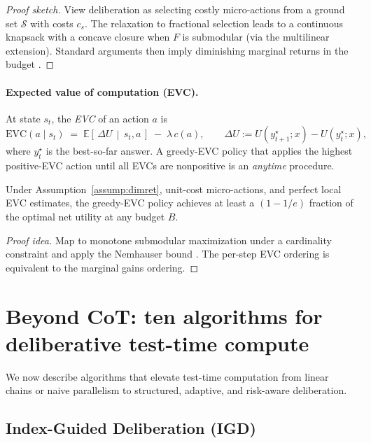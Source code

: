 \documentclass[11pt]{article}
\newcommand{\E}{\mathbb{E}}
\newcommand{\1}{\mathbb{I}}
\begin{document}
\begin{proof}[Proof sketch]
View deliberation as selecting costly micro-actions from a ground set $\mathcal{S}$ with costs $c_s$. The relaxation to fractional selection leads to a continuous knapsack with a concave closure when $F$ is submodular (via the multilinear extension). Standard arguments then imply diminishing marginal returns in the budget \cite{nemhauser1978}.
\end{proof}

\paragraph{Expected value of computation (EVC).} At state $s_t$, the \emph{EVC} of an action $a$ is
\begin{equation}
\mathrm{EVC}(a \mid s_t) \;=\; \E\!\left[\, \Delta U \,\middle|\, s_t, a \,\right] \;-\; \lambda\, c(a),
\qquad \Delta U := U(y^\star_{t+1};x)-U(y^\star_{t};x),
\label{eq:evc}
\end{equation}
where $y^\star_t$ is the best-so-far answer. A greedy-EVC policy that applies the highest positive-EVC action until all EVCs are nonpositive is an \emph{anytime} procedure.

\begin{theorem}
\label{thm:greedy}
Under Assumption~\ref{assump:dimret}, unit-cost micro-actions, and perfect local EVC estimates, the greedy-EVC policy achieves at least a $(1-1/e)$ fraction of the optimal net utility at any budget $B$.
\end{theorem}

\begin{proof}[Proof idea]
Map to monotone submodular maximization under a cardinality constraint and apply the Nemhauser bound \cite{nemhauser1978}. The per-step EVC ordering is equivalent to the marginal gains ordering.
\end{proof}

\section{Beyond CoT: ten algorithms for deliberative test-time compute}

We now describe algorithms that elevate test-time computation from linear chains or naive parallelism to structured, adaptive, and risk-aware deliberation.

\subsection{Index-Guided Deliberation (IGD)}
\end{document}
